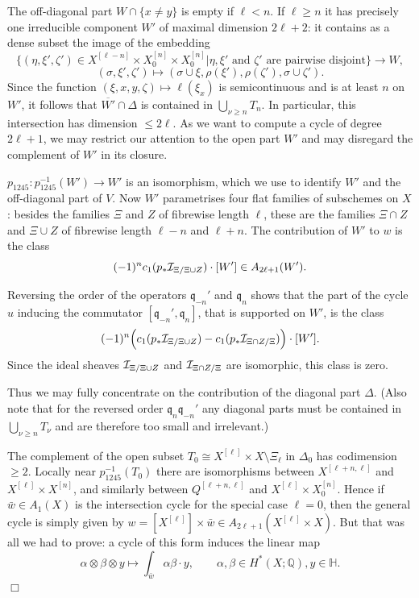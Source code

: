 \documentclass[twoside,11pt]{article}
\newcommand{\qed}{\hspace*{\fill}$\Box$\vspace{2ex}}
\newcommand{\ki}{{\cal I}}
\newcommand{\IH}{{\mathbb H}}
\newcommand{\IQ}{{\mathbb Q}}
\newcommand{\gothq}{{\mathfrak q}}
\newcommand{\isom}{\cong}
\newcommand{\tensor}{\otimes}
\newcommand{\qq}{\gothq}
\newcommand{\lra}{\longrightarrow}
\begin{document}
The off-diagonal part $W\cap\{x\neq y\}$ is empty if $\ell<n$. If $\ell\geq n$
it has precisely one irreducible component $W'$
of maximal dimension $2\ell+2$: it contains as a dense subset the image of
the embedding
$$\{(\eta,\xi',\zeta')\in X^{[\ell-n]}\times X^{[n]}_0\times X^{[n]}_0| \eta,\xi'\mbox{ and }\zeta'\mbox{ are pairwise disjoint}\}\lra W,$$
{}
$$(\sigma,\xi',\zeta')\mapsto(\sigma\cup\xi,\rho(\xi'),\rho(\zeta'),\sigma\cup
\zeta').$$
Since the function $(\xi,x,y,\zeta)\mapsto \ell(\xi_x)$ is semicontinuous and
is at least $n$ on $W'$, it follows that $\overline{W'}\cap \Delta$ is
contained in $\bigcup_{\nu\geq n}T_n$. In particular, this intersection has
dimension $\leq 2\ell$. As we want to compute a cycle of degree $2\ell+1$,
we may restrict our attention to the open part $W'$ and may disregard the complement
of $W'$ in its closure.  


$p_{1245}:p_{1245}^{-1}(W')\to W'$ is an isomorphism, which we use to
identify $W'$ and the off-diagonal part of $V$. Now $W'$ parametrises
four flat families of subschemes on $X$: besides the families $\Xi$ and $Z$ 
of fibrewise length $\ell$, these are the families $\Xi\cap Z$ and $\Xi\cup Z$ of
fibrewise length $\ell-n$ and $\ell+n$. The contribution of $W'$ to
$w$ is the class
$$(-1)^nc_1(p_*\ki_{\Xi/\Xi\cup Z})\cdot[W']\in A_{2\ell+1}(W').$$

Reversing the order of the operators $\qq_{-n}'$ and $\qq_n$ shows that
the part of the cycle $u$ inducing the commutator $[\qq_{-n}',\qq_n]$, that is 
supported on $W'$, is the class
$$(-1)^n\Big(c_1(p_*\ki_{\Xi/\Xi\cup Z})-c_1(p_*\ki_{\Xi\cap Z/\Xi})\Big)\cdot[W'].$$
Since the ideal sheaves $\ki_{\Xi/\Xi\cup Z}$ and $\ki_{\Xi\cap Z/\Xi}$ are
isomorphic, this class is zero.

Thus we may fully concentrate on the contribution of the diagonal part $\Delta$.
(Also note that for the reversed order $\qq_n\qq_{-n}'$ any diagonal parts
must be contained in $\bigcup_{\nu\geq n}T_\nu$ and are therefore too small
and irrelevant.)

The complement of the open subset $T_0\isom X^{[\ell]}\times X\setminus\Xi_\ell$
in $\Delta_0$ has codimension $\geq 2$. Locally near $p_{1245}^{-1}(T_0)$
there are isomorphisms between $X^{[\ell+n,\ell]}$ and $X^{[\ell]}\times 
X^{[n]}$, and similarly between $Q^{[\ell+n,\ell]}$ and $X^{[\ell]}\times X^{[n]}_0$. Hence if $\bar w\in A_1(X)$ is the intersection cycle for the 
special case $\ell=0$, then the general cycle is simply given by $w=[X^{[\ell]}]\times \bar w\in A_{2\ell+1}(X^{[\ell]}\times X)$. But that
was all we had to prove: a cycle of this form induces the linear map
$$\alpha\tensor\beta\tensor y\mapsto \int_{\bar w}\alpha\beta \cdot y,\qquad
\alpha,\beta\in H^*(X;\IQ), y\in \IH.$$
\qed
\end{document}
